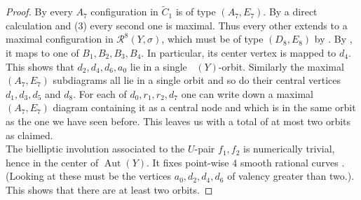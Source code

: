\documentclass[a4paper]{amsart}
\theoremstyle{definition}
\theoremstyle{plain}
\DeclareMathOperator{\Aut}{Aut}
\DeclareMathOperator{\aut}{Aut^*}
\newcommand{\R}{\mathcal{R}}
\begin{document}
\begin{proof}
By  every $A_7$ configuration in $\widetilde{C}_1$ is of type $(A_7,E_7)$. By a direct calculation and  (3) every second one is maximal. Thus every other extends to a maximal configuration in $\R^8(Y,\sigma)$, which must be of type $(D_8,E_8)$ by . By , it 
maps to one of $B_1,B_2,B_3,B_4$. In particular, its center vertex is mapped to $d_4$. This shows that $d_2,d_4,d_6,a_0$ lie in a single $\aut(Y)$-orbit.
Similarly the maximal $(A_7,E_7)$ subdiagrams all lie in a single orbit and so do their central vertices $d_1,d_3, d_5$ and $d_8$. For each of $d_0,r_1,r_2,d_7$ one can write down a maximal $(A_7,E_7)$ diagram containing it as a central node and which is in the same orbit as the one we have seen before.
This leaves us with a total of at most two orbits as claimed.\\

The bielliptic involution associated to the $U$-pair $f_1,f_2$ is numerically trivial, hence in the center of $\Aut(Y)$. It fixes point-wise $4$ smooth rational curves \cite[Table 8.8,Theorem 8.8.21, Remark 8.8.22]{enriquesII}. (Looking at  these must be the vertices $a_0,d_2,d_4,d_6$ of valency greater than two.).
This shows that there are at least two orbits.
\end{proof}
\end{document}
